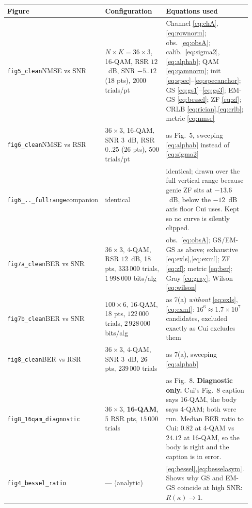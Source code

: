 \documentclass[11pt,a4paper]{article}
\begin{document}
\begin{longtable}{@{}p{}p{}p{}@{}}
\toprule
\textbf{Figure} & \textbf{Configuration} & \textbf{Equations used}\\
\midrule
\endhead
\texttt{fig5\_clean}\newline NMSE vs SNR
& $N\times K=36\times3$, 16-QAM, RSR $12$~dB, SNR $-5..12$ (18 pts), $2000$ trials/pt
& Channel \eqref{eq:chA},\eqref{eq:rownorm}; obs.\ \eqref{eq:obsA}; calib.\ \eqref{eq:sigma2},\eqref{eq:alphab}; QAM \eqref{eq:qamnorm}; init \eqref{eq:spec}--\eqref{eq:specanchor}; GS \eqref{eq:gs1}--\eqref{eq:gs3}; EM-GS \eqref{eq:bessel}; ZF \eqref{eq:zf}; CRLB \eqref{eq:rician},\eqref{eq:crlb}; metric \eqref{eq:nmse}\\
\addlinespace
\texttt{fig6\_clean}\newline NMSE vs RSR
& $36\times3$, 16-QAM, SNR $3$~dB, RSR $0..25$ (26 pts), $500$ trials/pt
& as Fig.~5, sweeping \eqref{eq:alphab} instead of \eqref{eq:sigma2}\\
\addlinespace
\texttt{fig6\_..\_fullrange}\newline companion
& identical
& identical; drawn over the full vertical range because genie ZF sits at $-13.6$~dB, below the $-12$~dB axis floor Cui uses. Kept so no curve is silently clipped.\\
\addlinespace
\texttt{fig7a\_clean}\newline BER vs SNR
& $36\times3$, 4-QAM, RSR $12$~dB, 18 pts, $333\,000$ trials, $1\,998\,000$ bits/alg
& obs.\ \eqref{eq:obsA}; GS/EM-GS as above; exhaustive \eqref{eq:exls},\eqref{eq:exml}; ZF \eqref{eq:zf}; metric \eqref{eq:ber}; Gray \eqref{eq:gray}; Wilson \eqref{eq:wilson}\\
\addlinespace
\texttt{fig7b\_clean}\newline BER vs SNR
& $100\times6$, 16-QAM, 18 pts, $122\,000$ trials, $2\,928\,000$ bits/alg
& as 7(a) \emph{without} \eqref{eq:exls},\eqref{eq:exml}: $16^6\approx1.7\times10^7$ candidates, excluded exactly as Cui excludes them\\
\addlinespace
\texttt{fig8\_clean}\newline BER vs RSR
& $36\times3$, 4-QAM, SNR $3$~dB, 26 pts, $239\,000$ trials
& as 7(a), sweeping \eqref{eq:alphab}\\
\addlinespace
\texttt{fig8\_16qam\_}\newline\texttt{diagnostic}
& $36\times3$, \textbf{16-QAM}, 5 RSR pts, $15\,000$ trials
& as Fig.~8. \textbf{Diagnostic only.} Cui's Fig.~8 caption says 16-QAM, the body says 4-QAM; both were run. Median BER ratio to Cui: $0.82$ at 4-QAM vs $24.12$ at 16-QAM, so the body is right and the caption is in error.\\
\addlinespace
\texttt{fig4\_bessel\_ratio}
& --- (analytic)
& \eqref{eq:bessel},\eqref{eq:besselasym}. Shows why GS and EM-GS coincide at high SNR: $R(\kappa)\to1$.\\
\bottomrule
\end{longtable}
\end{document}

